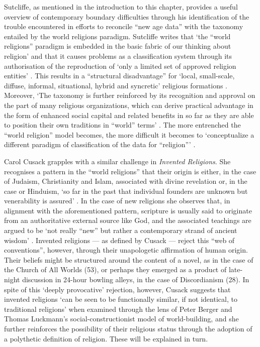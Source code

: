 \documentclass{article}
\begin{document}
Sutcliffe, as mentioned in the introduction to this chapter,
provides a useful overview of contemporary boundary difficulties through his
identification of the trouble encountered in efforts to reconcile
``new age data'' with the taxonomy entailed by the world religions paradigm.
Sutcliffe writes that `the ``world religions'' paradigm is embedded in the
basic fabric of our thinking about religion' and that it causes problems
as a classification system through its authorisation of the reproduction of
`only a limited set of approved religion entities'
\parencite[22]{Sutcliffe14}.
This results in a ``structural disadvantage'' for
`local, small-scale, diffuse, informal, situational, hybrid and syncretic'
religious formations \parencite[25]{Sutcliffe14}.
Moreover, `The taxonomy is further reinforced by
its recognition and approval on the part of many religious organizations,
which can derive practical advantage in the form of enhanced social capital
and related benefits in so far as they are able to position
their own traditions in ``world'' terms' \parencite[23]{Sutcliffe14}.
The more entrenched the ``world religion'' model becomes,
the more difficult it becomes to `conceptualize a different paradigm
of classification of the data for ``religion''\thinspace'
\parencite[25]{Sutcliffe14}.

Carol Cusack grapples with a similar challenge in \textit{Invented Religions}.
She recognises a pattern in the ``world religions'' that their origin is
either, in the case of Judaism, Christianity and Islam,
associated with divine revelation or, in the case or Hinduism,
`so far in the past that individual founders are unknown but venerability is
assured' \parencite[1]{Cusack10}.
In the case of new religions she observes that, in alignment with the
aforementioned pattern, scripture is usually said to originate from
an authoritative external source like God, and the associated teachings
are argued to be `not really ``new'' but rather a contemporary
strand of ancient wisdom' \parencite[1]{Cusack10}.
Invented religions --- as defined by Cusack --- reject this
``web of conventions'', however, through their unapologetic affirmation of
human origin.
Their beliefs might be structured around the content of a novel,
as in the case of the Church of All Worlds (53),
or perhaps they emerged as a product of late-night discussion in
24-hour bowling alleys, in the case of Discordianism (28).
In spite of this `deeply provocative' rejection,
however, Cusack suggests that invented religions `can be seen to be
functionally similar, if not identical, to traditional religions'
when examined through the lens of Peter Berger and Thomas Luckmann's
social-constructionist model of world-building, and she further reinforces
the possibility of their religious status through the adoption of a polythetic
definition of religion. These will be explained in turn.
\end{document}
